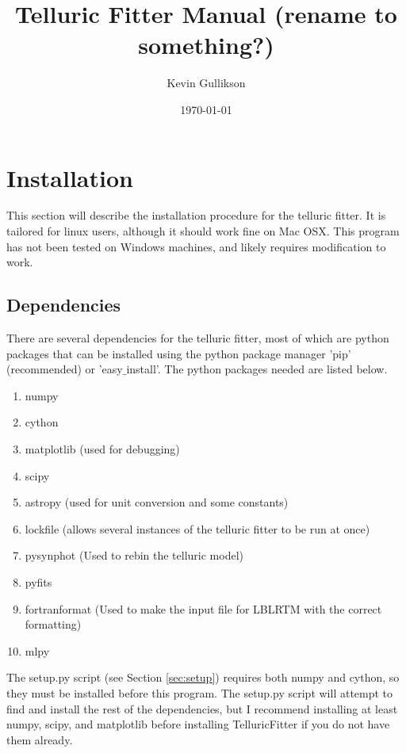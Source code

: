 \documentclass{article}
\begin{document}
\title{Telluric Fitter Manual (rename to something?)}
\author{Kevin Gullikson}
\date{\today}
\maketitle



\section{Installation}
\label{sec:installation}
This section will describe the installation procedure for the telluric fitter. It is tailored for linux users, although it should work fine on Mac OSX. This program has not been tested on Windows machines, and likely requires modification to work.
\subsection{Dependencies}
There are several dependencies for the telluric fitter, most of which are python packages that can be installed using the python package manager 'pip' (recommended) or 'easy$\_$install'. The python packages needed are listed below.
\begin{enumerate}
\item numpy
\item cython
\item matplotlib  (used for debugging)
\item scipy
\item astropy    (used for unit conversion and some constants)
\item lockfile   (allows several instances of the telluric fitter to be run at once)
\item pysynphot  (Used to rebin the telluric model)
\item pyfits
\item fortranformat (Used to make the input file for LBLRTM with the correct formatting)
\item mlpy
\end{enumerate}
The setup.py script (see Section \ref{sec:setup}) requires both numpy and cython, so they must be installed before this program. The setup.py script will attempt to find and install the rest of the dependencies, but I recommend installing at least numpy, scipy, and matplotlib before installing TelluricFitter if you do not have them already.
\end{document}
